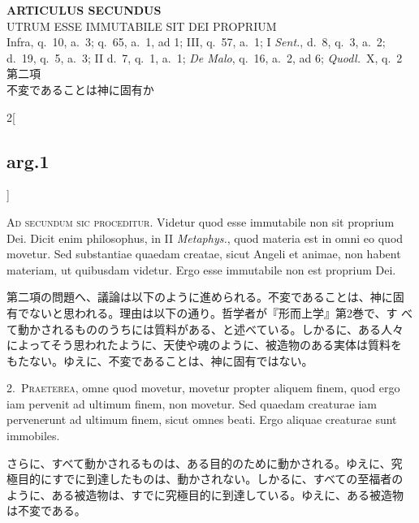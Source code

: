 \documentclass[paper=a4paper,fontsize=10pt,jafontsize=9pt,titlepage]{jlreq}
\begin{document}
\begin{center}
 {\Large {\bfseries ARTICULUS SECUNDUS}}\\
 {\large UTRUM ESSE IMMUTABILE SIT DEI PROPRIUM}\\
 {\footnotesize Infra, q.~10, a.~3; q.~65, a.~1, ad 1; III, q.~57, a.~1;
 I {\itshape Sent.}, d.~8, q.~3, a.~2; d.~19, q.~5, a.~3; II d.~7, q.~1,
 a.~1; {\itshape De Malo}, q.~16, a.~2, ad 6; {\itshape Quodl.}~X, q.~2}\\
 {\Large 第二項\\不変であることは神に固有か}
\end{center}

{}
\setcounter{section}{2}
\setcounter{subsection}{0}

\begin{paracol}{2}[\subsection{arg.1}]

{\huge A}{\scshape d secundum sic proceditur}. Videtur quod esse
immutabile non sit proprium Dei. Dicit enim philosophus, in II {\itshape
Metaphys.}, quod materia est in omni eo quod movetur. Sed substantiae
quaedam creatae, sicut Angeli et animae, non habent materiam, ut
quibusdam videtur. Ergo esse immutabile non est proprium Dei.

\switchcolumn

第二項の問題へ、議論は以下のように進められる。不変であることは、神に固
有でないと思われる。理由は以下の通り。哲学者が『形而上学』第2巻で、す
べて動かされるもののうちには質料がある、と述べている。しかるに、ある人々
によってそう思われたように、天使や魂のように、被造物のある実体は質料を
もたない。ゆえに、不変であることは、神に固有ではない。


2.~{\scshape Praeterea}, omne quod movetur, movetur propter aliquem
   finem, quod ergo iam pervenit ad ultimum finem, non movetur. Sed
   quaedam creaturae iam pervenerunt ad ultimum finem, sicut omnes
   beati. Ergo aliquae creaturae sunt immobiles.

\switchcolumn

さらに、すべて動かされるものは、ある目的のために動かされる。ゆえに、究
極目的にすでに到達したものは、動かされない。しかるに、すべての至福者の
ように、ある被造物は、すでに究極目的に到達している。ゆえに、ある被造物
は不変である。


\end{paracol}
\end{document}
